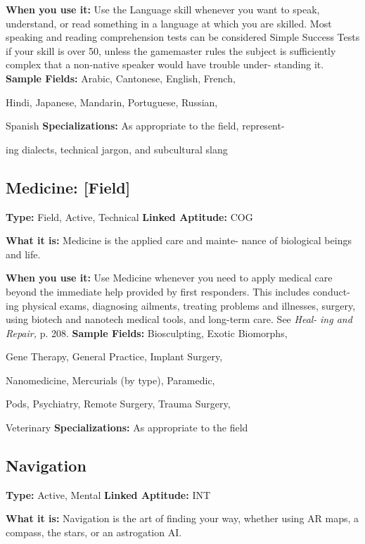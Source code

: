 \textbf{When you use it:} Use the Language skill whenever 
you want to speak, understand, or read something in 
a language at which you are skilled. Most speaking 
and reading comprehension tests can be considered 
Simple Success Tests if your skill is over 50, unless the 
gamemaster rules the subject is sufficiently complex 
that a non-native speaker would have trouble under-
standing it.
\textbf{Sample Fields:} Arabic, Cantonese, English, French, 

Hindi, Japanese, Mandarin, Portuguese, Russian, 

Spanish
\textbf{Specializations:} As appropriate to the field, represent-

ing dialects, technical jargon, and subcultural slang

\subsection{Medicine: [Field]}

\textbf{Type:} Field, Active, Technical
\textbf{Linked Aptitude:} COG

\textbf{What it is:} Medicine is the applied care and mainte-
nance of biological beings and life.

\textbf{When you use it:} Use Medicine whenever you need 
to apply medical care beyond the immediate help 
provided by first responders. This includes conduct-
ing physical exams, diagnosing ailments, treating 
problems and illnesses, surgery, using biotech and 
nanotech medical tools, and long-term care. See \textit{Heal-}
\textit{ing and Repair,} p. 208.
\textbf{Sample Fields:} Biosculpting, Exotic Biomorphs, 

Gene Therapy, General Practice, Implant Surgery, 

Nanomedicine, Mercurials (by type), Paramedic, 

Pods, Psychiatry, Remote Surgery, Trauma Surgery, 

Veterinary
\textbf{Specializations:} As appropriate to the field

\subsection{Navigation}

\textbf{Type:} Active, Mental
\textbf{Linked Aptitude:} INT

\textbf{What it is:} Navigation is the art of finding your way, 
whether using AR maps, a compass, the stars, or an 
astrogation AI.

